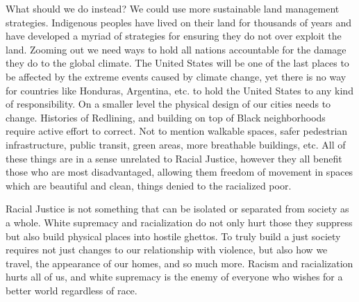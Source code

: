\documentclass[12pt]{article}
\begin{document}
What should we do instead? We could use more sustainable land management strategies. Indigenous peoples have lived on
their land for thousands of years and have developed a myriad of strategies for ensuring they do not over exploit the
land. Zooming out we need ways to hold all nations accountable for the damage they do to the global climate. The United
States will be one of the last places to be affected by the extreme events caused by climate change, yet there is no way
for countries like Honduras, Argentina, etc. to hold the United States to any kind of responsibility.
On a smaller level the physical design of our cities needs to change. Histories of Redlining, and building on top
of Black neighborhoods require active effort to correct. Not to mention walkable spaces, safer pedestrian infrastructure,
public transit, green areas, more breathable buildings, etc. All of these things are in a sense unrelated to Racial
Justice, however they all benefit those who are most disadvantaged, allowing them freedom of movement in spaces which
are beautiful and clean, things denied to the racialized poor.

Racial Justice is not something that can be isolated or separated from society as a whole. White supremacy and racialization
do not only hurt those they suppress but also build physical places into hostile ghettos. To truly build a just society
requires not just changes to our relationship with violence, but also how we travel, the appearance of our homes, and so
much more. Racism and racialization hurts all of us, and white supremacy is the enemy of everyone who wishes for a better
world regardless of race.


\printbibliography
\end{document}
